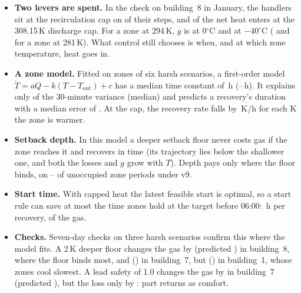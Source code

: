 \documentclass{article}
\begin{document}
\begin{itemize}
\item \textbf{Two levers are spent.} In the check on building~8 in January, the handlers sit at the recirculation cap on \RSevRecircCapShare{} of their steps, and \RSevCapHeatShare{} of the net heat enters at the 308.15\,K discharge cap. For a zone at 294\,K, $g$ is \RSevGZero{} at 0$^\circ$C and \RSevGMinusForty{} at $-40^\circ$C (\RSevGColdZero{} and \RSevGColdMinusForty{} for a zone at 281\,K). What control still chooses is when, and at which zone temperature, heat goes in.
\item \textbf{A zone model.} Fitted on \RSevNZones{} zones of six harsh scenarios, a first-order model $\dot T = aQ - k(T - T_{\text{out}}) + c$ has a median time constant of \RSevTauMed\,h (\RSevTauLo--\RSevTauHi\,h). It explains only \RSevRTwo{} of the 30-minute variance (median) and predicts a recovery's duration with a median error of \RSevRecErr. At the cap, the recovery rate falls by \RSevRateSlope\,K/h for each K the zone is warmer.
\item \textbf{Setback depth.} In this model a deeper setback floor never costs gas if the zone reaches it and recovers in time (its trajectory lies below the shallower one, and both the losses and $g$ grow with $T$). Depth pays only where the floor binds, on \RSevBindLo--\RSevBindHi{} of unoccupied zone periods under v9.
\item \textbf{Start time.} With capped heat the latest feasible start is optimal, so a start rule can save at most the time zones hold at the target before 06:00: \RSevHoldH\,h per recovery, \RSevHoldGas{} of the gas.
\item \textbf{Checks.} Seven-day checks on three harsh scenarios confirm this where the model fits. A 2\,K deeper floor changes the gas by \RSevChkEightNleMeas{} (predicted \RSevChkEightNlePred) in building~8, where the floor binds most, and \RSevChkSevenNleMeas{} (\RSevChkSevenNlePred) in building~7, but \RSevChkOneNleMeas{} (\RSevChkOneNlePred) in building~1, whose zones cool slowest. A lead safety of 1.0 changes the gas by \RSevChkSevenLsOMeas{} in building~7 (predicted \RSevChkSevenLsOPred), but the loss only by \RSevChkSevenLsOLoss: part returns as comfort.
\end{itemize}
\end{document}
